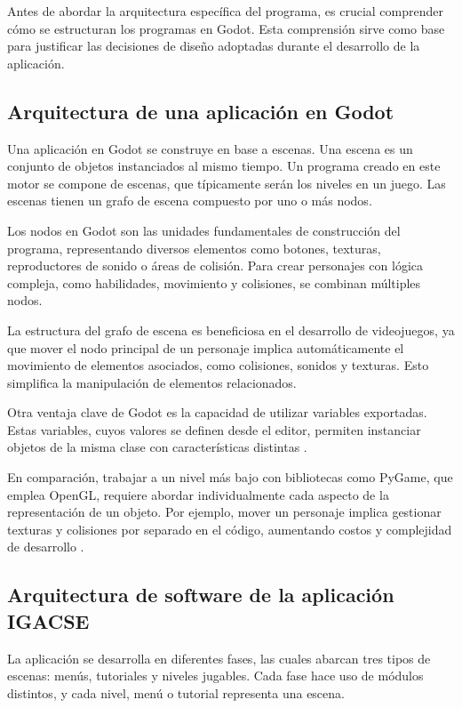 Antes de abordar la arquitectura específica del programa, es crucial comprender cómo se estructuran los programas en Godot. Esta comprensión sirve como base para justificar las decisiones de diseño adoptadas durante el desarrollo de la aplicación.

\subsection{Arquitectura de una aplicación en Godot}

Una aplicación en Godot se construye en base a escenas. Una escena es un conjunto de objetos instanciados al mismo tiempo. Un programa creado en este motor se compone de escenas, que típicamente serán los niveles en un juego. Las escenas tienen un grafo de escena compuesto por uno o más nodos.

Los nodos en Godot son las unidades fundamentales de construcción del programa, representando diversos elementos como botones, texturas, reproductores de sonido o áreas de colisión. Para crear personajes con lógica compleja, como habilidades, movimiento y colisiones, se combinan múltiples nodos.

La estructura del grafo de escena es beneficiosa en el desarrollo de videojuegos, ya que mover el nodo principal de un personaje implica automáticamente el movimiento de elementos asociados, como colisiones, sonidos y texturas. Esto simplifica la manipulación de elementos relacionados.

Otra ventaja clave de Godot es la capacidad de utilizar variables exportadas. Estas variables, cuyos valores se definen desde el editor, permiten instanciar objetos de la misma clase con características distintas \cite{GodotExportVariables}.

En comparación, trabajar a un nivel más bajo con bibliotecas como PyGame, que emplea OpenGL, requiere abordar individualmente cada aspecto de la representación de un objeto. Por ejemplo, mover un personaje implica gestionar texturas y colisiones por separado en el código, aumentando costos y complejidad de desarrollo \cite{GodotCollisionsAndRendering}.

\subsection{Arquitectura de software de la aplicación IGACSE}

La aplicación se desarrolla en diferentes fases, las cuales abarcan tres tipos de escenas: menús, tutoriales y niveles jugables. Cada fase hace uso de módulos distintos, y cada nivel, menú o tutorial representa una escena.

